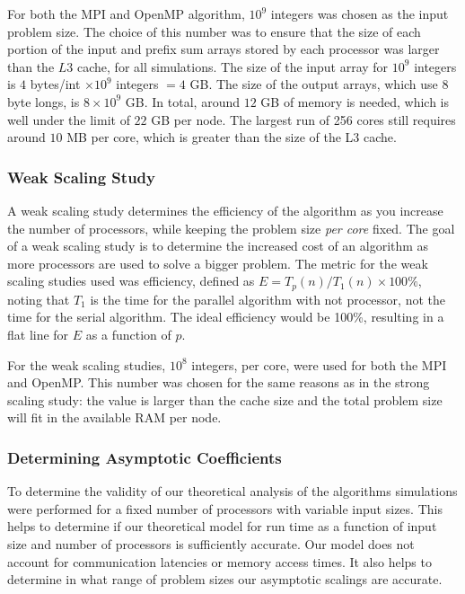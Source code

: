 \documentclass[12pt]{article}
\begin{document}
{{{For both the MPI and OpenMP algorithm, $10^9$ integers was chosen as the input
problem size. The choice of this number was to ensure that the size of each portion of
the input and prefix sum arrays stored by each processor was larger than the $L3$
cache, for all simulations.  The size of the input array for $10^9$ integers is $4$ bytes/int
$\times 10^9$ integers $=4$ GB.  The size of the output arrays, which use 8 byte
longs, is $8\times 10^9$ GB. In total, around $12$ GB of memory is needed, which is well
under the limit of $22$ GB per node.  The largest run of 256 cores still requires
around $10$ MB per core, which is greater than the size of the L3 cache.


\subsubsection{Weak Scaling Study}

A weak scaling study determines the efficiency of the algorithm as you increase the
number of processors, while keeping the problem size \emph{per core} fixed.
The goal of a weak scaling study is to determine the increased cost of an algorithm
as more processors are used to solve a bigger problem.  The metric for the weak scaling studies used was efficiency,
defined as $E = T_p(n)/T_1(n)\times 100\%$, noting that $T_1$ is the time for the parallel
algorithm with not processor, not the time for the serial algorithm.  The ideal
efficiency would be 100\%, resulting in a flat line for $E$ as a function of $p$.

For the weak scaling studies, $10^8$ integers, per core, were used for both the MPI
and OpenMP.  This number was chosen for the same reasons as in the strong scaling
study: the value is larger than the cache size and the total problem size will fit in
the available RAM per node.

\subsubsection{Determining Asymptotic Coefficients}

To determine the validity of our theoretical analysis of the algorithms simulations
were performed for a fixed number of processors with variable input sizes.  This
helps to determine if our theoretical model for run time as a function of input size
and number of processors is sufficiently accurate.  Our model does not account for
communication latencies or memory access times.  It also helps to determine in what
range of problem sizes our asymptotic scalings are accurate.  

}}}
\end{document}
